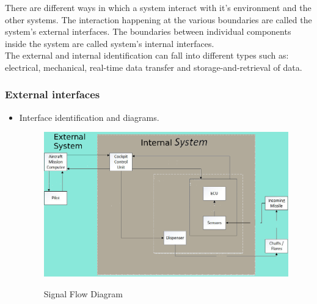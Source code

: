 There are different ways in which a system interact with it's environment and the other systems. The interaction happening at the various boundaries are called the system's external interfaces. The boundaries between individual components inside the system are called system's internal interfaces.\\
The external and internal identification can fall into different types such as: electrical, mechanical, real-time data transfer and storage-and-retrieval of data.

\subsubsection{External interfaces}
\begin{itemize}
\item {Interface identification and diagrams.}\\
\begin{figure}[h]
	\centering
	\includegraphics[scale=0.5]{./images/SignalFlowDiagramDDD}\\
	\caption{Signal Flow Diagram}
    \label{fig:sigFlowDiagram}
\end{figure}


\end{itemize}
